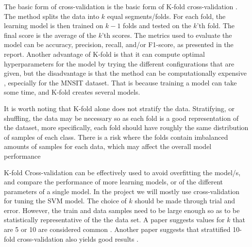 The basic form of cross-validation is the basic form of K-fold cross-validation \cite{Refaeilzadeh2009}. The method splits the data into $k$ equal segments/folds. For each fold, the learning model is then trained on $k-1$ folds and tested on the $k$'th fold. The final score is the average of the $k$'th scores. The metrics used to evaluate the model can be accuracy, precision, recall, and/or F1-score, as presented in the report. Another advantage of K-fold is that it can compute optimal hyperparameters for the model by trying the different configurations that are given, but the disadvantage is that the method can be computationally expensive \cite{scikit-learn}, especially for the MNSIT dataset. That is because training a model can take some time, and K-fold creates several models.


It is worth noting that K-fold alone does not stratify the data. Stratifying, or shuffling, the data may be necessary so as each fold is a good representation of the dataset, more specifically, each fold should have roughly the same distribution of samples of each class. There is a risk where the folds contain imbalanced amounts of samples for each data, which may affect the overall model performance \cite{Refaeilzadeh2009}


K-fold Cross-validation can be effectively used to avoid overfitting the model/s, and compare the performance of more learning models, or of the different parameters of a single model. In the project we will mostly use cross-validation for tuning the SVM model. The choice of $k$ should be made through trial and error. However, the train and data samples need to be large enough so as to be statistically representative of the the data set. A paper suggests values for  $k$ that are 5 or 10 are considered common \cite{introduction-to-statistical-learning}. Another paper suggests that strattified 10-fold cross-validation also yields good results \cite{Refaeilzadeh2009} \cite{kohavi1995study}.




